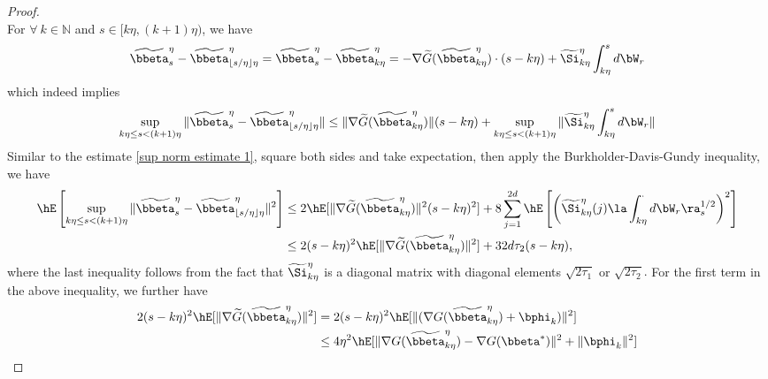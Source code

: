 \begin{proof}
\begin{equation}
\end{equation}{}
For $\forall~ k\in\mathbb N$ and $s\in [k\eta,(k+1)\eta)$, we have
\begin{equation*}
    \begin{split}
        \widetilde \bbeta^{\eta}_s-\widetilde \bbeta^{\eta}_{\lfloor s/\eta \rfloor\eta}=\widetilde \bbeta^{\eta}_s-\widetilde \bbeta^{\eta}_{k\eta}=-\nabla\widetilde G(\widetilde \bbeta^{\eta}_{k\eta})\cdot(s-k\eta)+\widetilde\Si^{\eta}_{k\eta}\int_{k\eta}^sd\bW_r
    \end{split}{}
\end{equation*}{}
which indeed implies
\begin{equation*}
    \begin{split}
     \sup_{k\eta\le s<(k+1)\eta}  \| \widetilde \bbeta^{\eta}_s-\widetilde \bbeta^{\eta}_{\lfloor s/\eta \rfloor\eta}\|\le \|\nabla\widetilde G(\widetilde \bbeta^{\eta}_{k\eta})\|(s-k\eta)+\sup_{k\eta\le s<(k+1)\eta} \|\widetilde\Si^{\eta}_{k\eta}\int_{k\eta}^sd\bW_r\|
    \end{split}{}
\end{equation*}{}
Similar to the estimate \eqref{sup norm estimate 1}, square both sides and take expectation, then apply the Burkholder-Davis-Gundy inequality, we have
\begin{equation*}
    \begin{split}
        \hE\left[\sup_{k\eta\le s<(k+1)\eta}  \| \widetilde \bbeta^{\eta}_s-\widetilde \bbeta^{\eta}_{\lfloor s/\eta \rfloor\eta}\|^2 \right]&\le 2\hE[ \|\nabla\widetilde G(\widetilde \bbeta^{\eta}_{k\eta})\|^2(s-k\eta)^2 ]+8\sum_{j=1}^{2d}\hE\left[\left(\widetilde \Si^{\eta}_{k\eta}(j)\la \int_{k\eta}^{\cdot}d\bW_r \ra_s^{1/2}\right)^2 \right]\\
         &\le  2(s-k\eta)^2\hE[ \|\nabla \widetilde G(\widetilde \bbeta^{\eta}_{k\eta})\|^2]+32d\tau_2(s-k\eta),
    \end{split}{}
\end{equation*}{}
where the last inequality follows from the fact that $\widetilde \Si^{\eta}_{k\eta}$ is a diagonal matrix with diagonal elements $\sqrt{2\tau_1}$ or $\sqrt{2\tau_2}.$
For the first term in the above inequality, we further have
\begin{equation*}
    \begin{split}
  2(s-k\eta)^2 \hE[ \|\nabla \widetilde G(\widetilde \bbeta^{\eta}_{k\eta})\|^2]&=        2(s-k\eta)^2\hE[ \|(\nabla G(\widetilde \bbeta^{\eta}_{k\eta})+\bphi_k)\|^2 ]\\
&\le 4\eta^2\hE[ \|\nabla  G(\widetilde \bbeta^{\eta}_{k\eta})-\nabla  G(\bbeta^*) \|^2+\|\bphi_k\|^2 ]\\

\end{split}
\end{equation*}
\end{proof}
